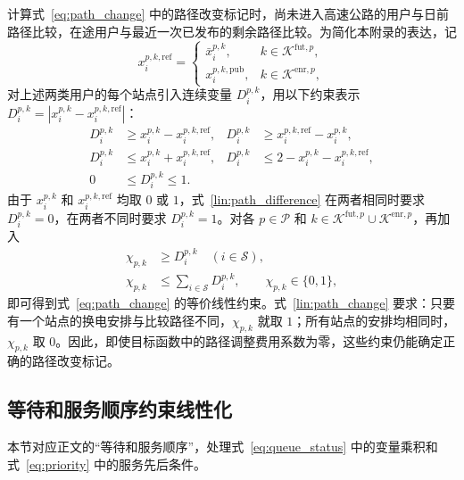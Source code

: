 计算式~\eqref{eq:path_change} 中的路径改变标记时，尚未进入高速公路的用户与日前路径比较，在途用户与最近一次已发布的剩余路径比较。为简化本附录的表达，记
\begin{equation}
x_i^{p,k,\mathrm{ref}}=
\begin{cases}
\bar x_i^{p,k}, & k\in\mathcal K^{\mathrm{fut},p},\\
x_i^{p,k,\mathrm{pub}}, & k\in\mathcal K^{\mathrm{enr},p},
\end{cases}
\label{lin:path_reference}
\end{equation}
对上述两类用户的每个站点引入连续变量 $D_i^{p,k}$，用以下约束表示 $D_i^{p,k}=|x_i^{p,k}-x_i^{p,k,\mathrm{ref}}|$：
\begin{equation}
\begin{aligned}
D_i^{p,k}&\ge x_i^{p,k}-x_i^{p,k,\mathrm{ref}},&
D_i^{p,k}&\ge x_i^{p,k,\mathrm{ref}}-x_i^{p,k},\\
D_i^{p,k}&\le x_i^{p,k}+x_i^{p,k,\mathrm{ref}},&
D_i^{p,k}&\le 2-x_i^{p,k}-x_i^{p,k,\mathrm{ref}},\\
0&\le D_i^{p,k}\le1.
\end{aligned}
\label{lin:path_difference}
\end{equation}
由于 $x_i^{p,k}$ 和 $x_i^{p,k,\mathrm{ref}}$ 均取 $0$ 或 $1$，式~\eqref{lin:path_difference} 在两者相同时要求 $D_i^{p,k}=0$，在两者不同时要求 $D_i^{p,k}=1$。对各 $p\in\mathcal P$ 和 $k\in\mathcal K^{\mathrm{fut},p}\cup\mathcal K^{\mathrm{enr},p}$，再加入
\begin{equation}
\begin{aligned}
\chi_{p,k}&\ge D_i^{p,k}\quad(i\in\mathcal S),\\
\chi_{p,k}&\le\sum_{i\in\mathcal S}D_i^{p,k},
\qquad \chi_{p,k}\in\{0,1\},
\end{aligned}
\label{lin:path_change}
\end{equation}
即可得到式~\eqref{eq:path_change} 的等价线性约束。式~\eqref{lin:path_change} 要求：只要有一个站点的换电安排与比较路径不同，$\chi_{p,k}$ 就取 $1$；所有站点的安排均相同时，$\chi_{p,k}$ 取 $0$。因此，即使目标函数中的路径调整费用系数为零，这些约束仍能确定正确的路径改变标记。

\subsection{等待和服务顺序约束线性化}
\label{lin:waiting_priority_section}
本节对应正文的“等待和服务顺序”，处理式~\eqref{eq:queue_status} 中的变量乘积和式~\eqref{eq:priority} 中的服务先后条件。

